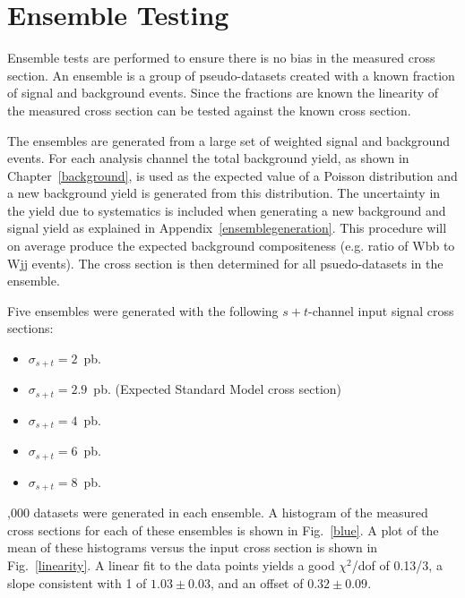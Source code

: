 \clearpage
\section{Ensemble Testing}
\label{ensembles}

Ensemble tests are performed to ensure there is no bias in the measured cross section. An ensemble is a group of pseudo-datasets created with a known fraction of signal and background events. Since the fractions are known the linearity of the measured cross section can be tested against the known cross section.

The ensembles are generated from a large set of weighted signal and background events. For each analysis channel the total background yield, as shown in Chapter~\ref{background}, is used as the expected value of a Poisson distribution and a new background yield is generated from this distribution. The uncertainty in the yield due to systematics is included when generating a new background and signal yield as explained in Appendix~\ref{ensemblegeneration}. This procedure will on average produce the expected background compositeness (e.g. ratio of Wbb to Wjj events). The cross section is then determined for all psuedo-datasets in the ensemble.

Five ensembles were generated with the following $s+t$-channel input signal cross sections:

\begin{itemize}
\item $\sigma_{s+t} = 2$~pb.
\item $\sigma_{s+t} = 2.9$~pb. (Expected Standard Model cross section)
\item $\sigma_{s+t} = 4$~pb.
\item $\sigma_{s+t} = 6$~pb.
\item $\sigma_{s+t} = 8$~pb.
\end{itemize}

,000 datasets were generated in each ensemble. A histogram of the measured cross sections for each of these ensembles is shown in Fig.~\ref{blue}. A plot of the mean of these histograms versus the input cross section is shown in Fig.~\ref{linearity}. A linear fit to the data points yields a good $\chi^{2}$/dof of 0.13/3, a slope consistent with 1 of $1.03\pm0.03$, and an offset of $0.32\pm0.09$.

